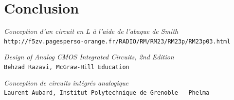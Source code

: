 \documentclass[a4paper]{article}
\begin{document}
\clearpage

\section*{Conclusion}


\begin{thebibliography}{9}

\textit{Conception d'un circuit en L \`a l'aide de l'abaque de Smith}\\
\texttt{http://f5zv.pagesperso-orange.fr/RADIO/RM/RM23/RM23p/RM23p03.html}

\textit{Design of Analog CMOS Integrated Circuits, 2nd Edition}\\
\texttt{Behzad Razavi, McGraw-Hill Education}

\textit{Conception de circuits int\'egr\'es analogique}\\
\texttt{Laurent Aubard, Institut Polytechnique de Grenoble - Phelma}

\end{thebibliography}
\end{document}
